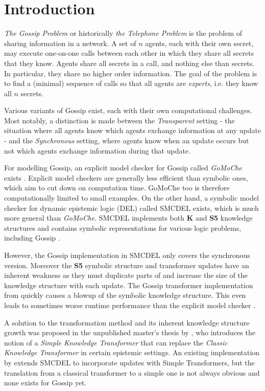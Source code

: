 \section{Introduction}

\textit{The Gossip Problem} or historically \textit{the Telephone Problem} is the problem of sharing information in a network.
A set of $n$ agents, each with their own secret, may execute one-on-one calls between each other in which they share all secrets that they know.
Agents share all secrets in a call, and nothing else than secrets. In particular, they share no higher order information.
The goal of the problem is to find a (minimal) sequence of calls so that all agents are \emph{experts}, i.e. they know all $n$ secrets.

Various variants of Gossip exist, each with their own computational challenges.
Most notably, a distinction is made between the \textit{Transparent} setting - the situation where all agents know
which agents exchange information at any update - and the \textit{Synchronous} setting, where agents know when an
update occurs but not which agents exchange information during that update.

For modelling Gossip, an explicit model checker for Gossip called \textit{GoMoChe} exists \cite{gattinger2023gomoche}.
Explicit model checkers are generally less efficient than symbolic ones, which aim to cut down on computation time.
GoMoChe too is therefore computationally limited to small examples. On the other hand,
a symbolic model checker for dynamic epistemic logic (DEL) called SMCDEL exists, which is much more general than \textit{GoMoChe}.
SMCDEL implements both \textbf{K} and \textbf{S5} knowledge structures and contains symbolic representations for various logic problems,
including Gossip \cite{GattingerThesis2018}.

However, the Gossip implementation in SMCDEL only covers the synchronous version.
Moreover the \textbf{S5} symbolic structure and transformer updates have an inherent weakness
as they must duplicate parts of and increase the size of the knowledge structure with each update.
The Gossip transformer implementation from \cite{GattingerThesis2018} quickly causes a blowup of the symbolic knowledge structure.
This even leads to sometimes worse runtime performance than the explicit model checker \cite{danielMasterThesis}.

A solution to the transformation method and its inherent knowledge structure growth was proposed in the unpublished master's thesis by \cite{danielMasterThesis},
who introduces the notion of a \textit{Simple Knowledge Transformer} that can replace the \textit{Classic Knowledge Transformer} in certain epistemic settings.
An existing implementation by \cite{HaitianHanabi} extends SMCDEL to incorporate updates with Simple Transformers,
but the translation from a classical transformer to a simple one is not always obvious and none exists for Gossip yet.

